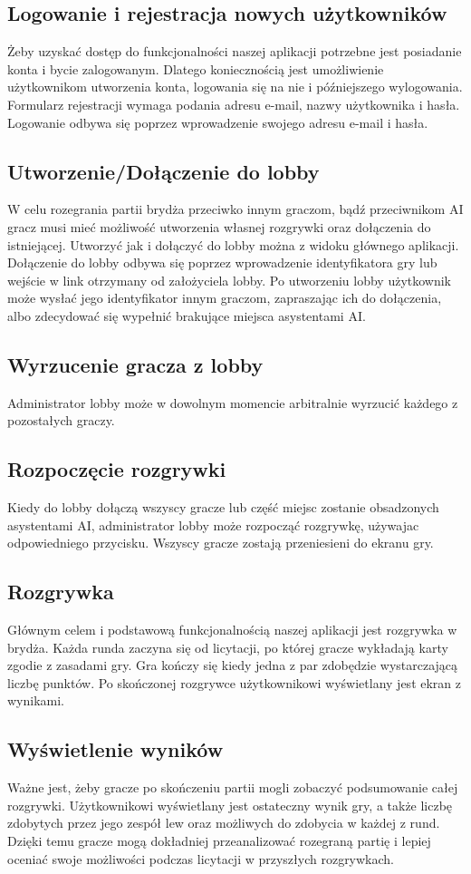 \subsection{Logowanie i rejestracja nowych użytkowników}
Żeby uzyskać dostęp do funkcjonalności naszej aplikacji potrzebne jest posiadanie konta i bycie zalogowanym. Dlatego koniecznością jest umożliwienie użytkownikom utworzenia konta, logowania się na nie i późniejszego wylogowania. Formularz rejestracji wymaga podania adresu e-mail, nazwy użytkownika i hasła. Logowanie odbywa się poprzez wprowadzenie swojego adresu e-mail i hasła.
\subsection{Utworzenie/Dołączenie do lobby}
W celu rozegrania partii brydża przeciwko innym graczom, bądź przeciwnikom AI gracz musi mieć możliwość utworzenia własnej rozgrywki oraz dołączenia do istniejącej. Utworzyć jak i dołączyć do lobby można z widoku głównego aplikacji.  Dołączenie do lobby odbywa się poprzez wprowadzenie identyfikatora gry lub wejście w link otrzymany od założyciela lobby. Po utworzeniu lobby użytkownik może wysłać jego identyfikator innym graczom, zapraszając ich do dołączenia, albo zdecydować się wypełnić brakujące miejsca asystentami AI. 
\subsection{Wyrzucenie gracza z lobby}
Administrator lobby może w dowolnym momencie arbitralnie wyrzucić każdego z pozostałych graczy.
\subsection{Rozpoczęcie rozgrywki}
Kiedy do lobby dołączą wszyscy gracze lub część miejsc zostanie obsadzonych asystentami AI, administrator lobby może rozpocząć rozgrywkę, używajac odpowiedniego przycisku. Wszyscy gracze zostają przeniesieni do ekranu gry. 
\subsection{Rozgrywka}
Głównym celem i podstawową funkcjonalnością naszej aplikacji jest rozgrywka w brydża. Każda runda zaczyna się od licytacji, po której gracze wykładają karty zgodie z zasadami gry. Gra kończy się kiedy jedna z par zdobędzie wystarczającą liczbę punktów. Po skończonej rozgrywce użytkownikowi wyświetlany jest ekran z wynikami.
\subsection{Wyświetlenie wyników}
Ważne jest, żeby gracze po skończeniu partii mogli zobaczyć podsumowanie całej rozgrywki. Użytkownikowi wyświetlany jest ostateczny wynik gry, a także liczbę zdobytych przez jego zespół lew oraz możliwych do zdobycia w każdej z rund. Dzięki temu gracze mogą dokładniej przeanalizować rozegraną partię i lepiej oceniać swoje możliwości podczas licytacji w przyszłych rozgrywkach. 
